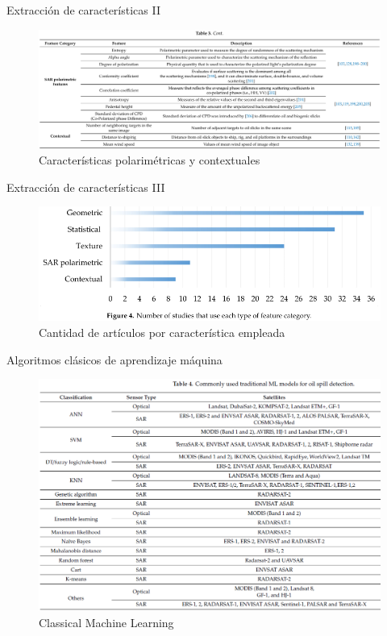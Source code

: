 \begin{frame}{Extracción de características II}
  \begin{figure}
      \centering
      \includegraphics[scale=1.0]{img/section_02/tabla_caracteristicas_02.png}
      \caption{Características polarimétricas y contextuales}
      \label{fig:optical_features_01}
  \end{figure}
\end{frame}

\begin{frame}{Extracción de características III}
  \begin{figure}
      \centering
      \includegraphics[scale=1.0]{img/section_02/tabla_caracteristicas_03.png}
      \caption{Cantidad de artículos por característica empleada}
      \label{fig:optical_features_01}
  \end{figure}
\end{frame}

\begin{frame}{Algoritmos clásicos de aprendizaje máquina}
    \begin{figure}
        \centering
        \includegraphics[scale=0.4]{img/section_02/oil_spill_detection_machine_learning.png}
        \caption{Classical Machine Learning}
        \label{fig:my_label}
    \end{figure}
\end{frame}

